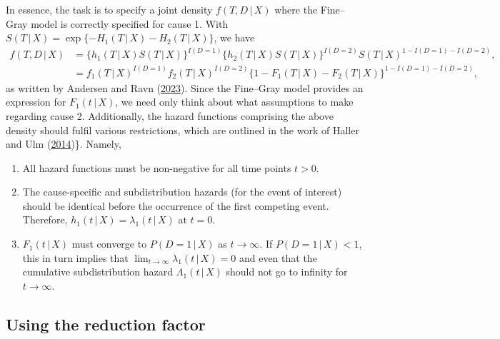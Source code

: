 \documentclass[
  letterpaper,
  DIV=11,
  numbers=noendperiod]{scrreprt}
\providecommand{\tightlist}{%
  \setlength{\itemsep}{0pt}\setlength{\parskip}{0pt}}\usepackage{longtable,booktabs,array}
\newcommand{\given}{\,|\,}
\begin{document}
In essence, the task is to specify a joint density \(f(T, D \given X)\)
where the Fine--Gray model is correctly specified for cause 1. With
\(S(T \given X) = \exp\{-H_1(T \given X) - H_2(T \given X)\}\), we have
\begin{align*}
    f(T,D \given X) &= \{h_1(T \given X)S(T \given X)\}^{I(D = 1)}\{h_2(T \given X)S(T \given X)\}^{I(D = 2)}S(T \given X)^{1 - I(D = 1) - I(D = 2)}, \\
    &= f_1(T \given X)^{I(D = 1)}f_2(T \given X)^{I(D = 2)}\{1 - F_1(T \given X) - F_2(T \given X)\}^{1 - I(D = 1) - I(D = 2)},
\end{align*} as written by Andersen and Ravn
(\protect\hyperlink{ref-andersenModelsMultiStateSurvival2023}{2023}).
Since the Fine--Gray model provides an expression for
\(F_1(t \given X)\), we need only think about what assumptions to make
regarding cause 2. Additionally, the hazard functions comprising the
above density should fulfil various restrictions, which are outlined in
the work of Haller and Ulm
(\protect\hyperlink{ref-hallerFlexibleSimulationCompeting2014}{2014})\}.
Namely,

\begin{enumerate}
\def\labelenumi{\arabic{enumi}.}
\tightlist
\item
  All hazard functions must be non-negative for all time points
  \(t > 0\).
\item
  The cause-specific and subdistribution hazards (for the event of
  interest) should be identical before the occurrence of the first
  competing event. Therefore,
  \(h_1(t \given X) = \lambda_1(t \given X)\) at \(t = 0\).
\item
  \(F_1(t \given X)\) must converge to \(P(D = 1 \given X)\) as
  \(t \to \infty\). If \(P(D = 1 \given X) < 1\), this in turn implies
  that \(\lim_{t \to \infty} \lambda_1(t \given X) = 0\) and even that
  the cumulative subdistribution hazard \(\Lambda_1(t \given X)\) should
  not go to infinity for \(t \to \infty\).
\end{enumerate}

\hypertarget{using-the-reduction-factor}{%
\subsection{Using the reduction
factor}\label{using-the-reduction-factor}}
\end{document}

